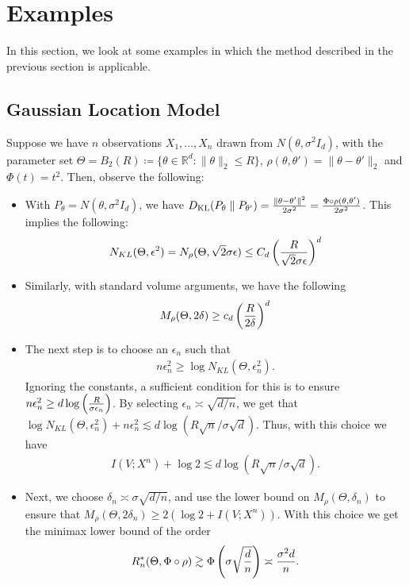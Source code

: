 \documentclass[12pt]{article}
\begin{document}
\section{Examples}
In this section, we look at some examples in which the method described in the previous section is applicable. 

\subsection{Gaussian Location Model}
\label{subsec:GLM-estimation}

Suppose we have $n$ \iid observations $X_1, \ldots, X_n$ drawn from $N(\theta, \sigma^2 I_d)$, with the parameter set $\Theta = B_2(R) \coloneqq \{\theta \in \mathbb{R}^d: \|\theta\|_2 \leq R\}$,  $\rho(\theta, \theta') = \|\theta - \theta'\|_2$ and $\Phi(t) = t^2$. Then, observe the following: 
\begin{itemize}
	\item With $P_\theta = N(\theta, \sigma^2 I_d)$, we have $D_{\text{KL}}(P_{\theta} \parallel P_{\theta'}) = \frac{\|\theta-\theta'\|^2}{2\sigma^2} = \frac{\Phi \circ \rho(\theta, \theta')}{2 \sigma^2}$. This implies the following: 
	\begin{align}
		N_{KL}(\Theta, \epsilon^2) = N_\rho(\Theta, \sqrt{2}\sigma \epsilon) \leq C_d \left( \frac{R }{\sqrt{2}\sigma \epsilon} \right)^d
	\end{align}
	\item Similarly, with standard volume arguments, we have the following 
	\begin{align}
		M_\rho(\Theta, 2\delta) \geq c_d \left( \frac{R}{2\delta} \right)^d
	\end{align}
	\item The next step is to choose an $\epsilon_n$ such that 
	\begin{align}
		n \epsilon_n^2 \geq \log N_{KL}(\Theta, \epsilon_n^2). 
	\end{align}
	Ignoring the constants, a sufficient condition for this is to ensure $n \epsilon_n^2 \geq d \log \left( \frac{R}{ \sigma \epsilon_n} \right)$. By selecting $\epsilon_n \asymp \sqrt{d/n}$, we get that $\log N_{KL}(\Theta, \epsilon_n^2) + n \epsilon_n^2 \lesssim d\log(R \sqrt{n}/\sigma \sqrt{d})$. Thus, with this choice we have 
	\begin{align}
		I(V; X^n) + \log 2 \lesssim d\log(R\sqrt{n}/ \sigma \sqrt{d}). 
	\end{align}
	\item Next, we choose $\delta_n \asymp \sigma \sqrt{d/n}$, and use the lower bound on $M_\rho(\Theta, \delta_n)$ to ensure that $M_\rho(\Theta, 2\delta_n) \geq 2(\log 2 + I(V;X^n))$. With this choice we get the minimax lower bound of the order 
	\begin{align}
		R_n^*(\Theta, \Phi \circ \rho) \gtrsim \Phi\left( \sigma \sqrt{\frac{d}{n}} \right) \asymp \frac{\sigma^2 d}{n}. 
	\end{align}
\end{itemize}
\end{document}
